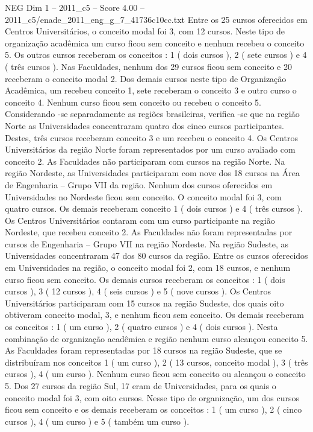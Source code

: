\begin{textsample}{NEG Dim 1 – 2011\_c5 – Score 4.00 – 2011\_c5/enade\_2011\_eng\_g\_7\_41736c10cc.txt}
Entre os 25 cursos oferecidos em Centros Universitários, o conceito modal foi 3, com 12 cursos.
Neste tipo de organização acadêmica um curso ficou sem conceito e nenhum recebeu o conceito 5.
Os outros cursos receberam os conceitos : 1 ( dois cursos ), 2 ( sete cursos ) e 4 ( três cursos ).
Nas Faculdades, nenhum dos 29 cursos ficou sem conceito e 20 receberam o conceito modal 2.
Dos demais cursos neste tipo de Organização Acadêmica, um recebeu conceito 1, sete receberam o conceito 3 e outro curso o conceito 4.
Nenhum curso ficou sem conceito ou recebeu o conceito 5.
Considerando -se separadamente as regiões brasileiras, verifica -se que na região Norte as Universidades concentraram quatro dos cinco cursos participantes.
Destes, três cursos receberam conceito 3 e um recebeu o conceito 4.
Os Centros Universitários da região Norte foram representados por um curso avaliado com conceito 2.
As Faculdades não participaram com cursos na região Norte.
Na região Nordeste, as Universidades participaram com nove dos 18 cursos na Área de Engenharia – Grupo VII da região.
Nenhum dos cursos oferecidos em Universidades no Nordeste ficou sem conceito.
O conceito modal foi 3, com quatro cursos.
Os demais receberam conceito 1 ( dois cursos ) e 4 ( três cursos ).
Os Centros Universitários contaram com um curso participante na região Nordeste, que recebeu conceito 2.
As Faculdades não foram representadas por cursos de Engenharia – Grupo VII na região Nordeste.
Na região Sudeste, as Universidades concentraram 47 dos 80 cursos da região.
Entre os cursos oferecidos em Universidades na região, o conceito modal foi 2, com 18 cursos, e nenhum curso ficou sem conceito.
Os demais cursos receberam os conceitos : 1 ( dois cursos ), 3 ( 12 cursos ), 4 ( seis cursos ) e 5 ( nove cursos ).
Os Centros Universitários participaram com 15 cursos na região Sudeste, dos quais oito obtiveram conceito modal, 3, e nenhum ficou sem conceito.
Os demais receberam os conceitos : 1 ( um curso ), 2 ( quatro cursos ) e 4 ( dois cursos ).
Nesta combinação de organização acadêmica e região nenhum curso alcançou conceito 5.
As Faculdades foram representadas por 18 cursos na região Sudeste, que se distribuíram nos conceitos 1 ( um curso ), 2 ( 13 cursos, conceito modal ), 3 ( três cursos ), 4 ( um curso ).
Nenhum curso ficou sem conceito ou alcançou o conceito 5.
Dos 27 cursos da região Sul, 17 eram de Universidades, para os quais o conceito modal foi 3, com oito cursos.
Nesse tipo de organização, um dos cursos ficou sem conceito e os demais receberam os conceitos : 1 ( um curso ), 2 ( cinco cursos ), 4 ( um curso ) e 5 ( também um curso ).

\end{textsample}

